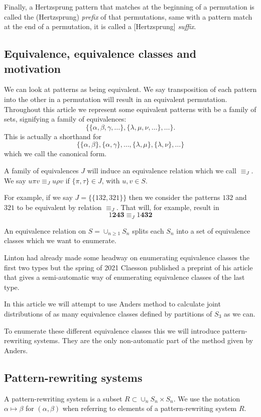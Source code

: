 \documentclass[a4paper, 11pt, english]{article}
\newcommand{\patternrule}{ \mapsto \!}
\theoremstyle{definition}
\newcommand{\Sym}{S}
\begin{document}
Finally, a Hertzsprung pattern that matches at the beginning of a permutation is
called the (Hertzsprung) \emph{prefix} of that permutations, same with a pattern
match at the end of a permutation, it is called a [Hertzsprung] \emph{suffix}.

\subsection{Equivalence, equivalence classes and motivation}
We can look at patterns as being equivalent. We say transposition of each pattern into
the other in a permutation will result in an equivalent permutation. Throughout
this article we represent some equivalent patterns with be a family of sets, signifying
a family of equivalences:
\[
    \{ \{\alpha, \beta, \gamma, \dots \}, \{\lambda, \mu, \nu, \dots \}, \dots
    \}.
\]
This is actually a shorthand for
\[
    \{ \{ \alpha, \beta \}, \{ \alpha, \gamma \}, \dots, \{ \lambda, \mu \}, \{
        \lambda, \nu \}, \dots \}
\]
which we call the canonical form.

A family of equivalences $J$ will induce an equivalence relation which we call $\equiv_J$. We
say $u \pi v \equiv_J u \rho v$ if $\{ \pi, \tau \} \in J$, with $u,v \in \Sym$.

For example, if we say $J = \{ \{ 132, 321 \} \}$ then we consider the patterns $132$ and $321$ to
be equivalent by relation $\equiv_J$. That will, for example, result in
\[
    1\bm{243} \equiv_J 1\bm{432}
\]

An equivalence relation on $\Sym = \cup_{n \geq 1} \Sym_n$ splits each $\Sym_n$
into a set of equivalence classes which we want to enumerate. 

Linton had already made some headway on enumerating equivalence classes the
first two types but the spring of 2021 Claesson published a preprint of his
article that gives a semi-automatic way of enumerating equivalence classes of
the last type.

In this article we will attempt to use Anders method to calculate joint
distributions of as many equivalence classes defined by partitions of $\Sym_3$
as we can.

To enumerate these different equivalence classes this we will introduce
pattern-rewriting systems. They are the only non-automatic part of the method
given by Anders.

\subsection{Pattern-rewriting systems}
A pattern-rewriting system is a subset $R \subset \cup_{n} \Sym_n \times \Sym_n$.
We use the notation $\alpha \patternrule \beta$ for $(\alpha, \beta)$ when referring
to elements of a pattern-rewriting system $R$. 
\end{document}
